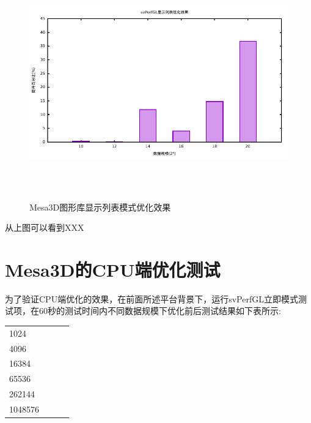 \begin{figure}[H] 
  \centering
  \includegraphics[width=14cm,height=10cm]{figures/gnuplot/result/dsp.eps}
  \caption{Mesa3D图形库显示列表模式优化效果}
  \label{fig:svPerfGL-dsp}
\end{figure}

从上图可以看到XXX

\section{Mesa3D的CPU端优化测试}

为了验证CPU端优化的效果，在前面所述平台背景下，运行svPerfGL立即模式测试项，在60秒的测试时间内不同数据规模下优化前后测试结果如下表所示:

\begin{center}  
\tablelasttail{\bottomrule}

\begin{supertabular}{p{4.cm}<{\centering}p{4.cm}<{\centering}p{4.cm}<{\centering}p{3.cm}<{\centering}}
	1024& & &	\\
	4096& & &	\\
	16384& & &	\\
	65536& & &	\\
	262144& & &	\\
    1048576& & & \\
\end{supertabular}
\end{center}

